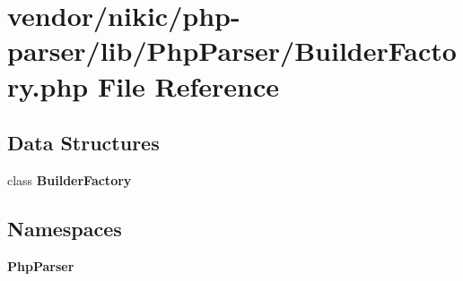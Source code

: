 \section{vendor/nikic/php-\/parser/lib/\+Php\+Parser/\+Builder\+Factory.php File Reference}
\label{_builder_factory_8php}
\subsection*{Data Structures}
\begin{DoxyCompactItemize}
\item 
class {\bf Builder\+Factory}
\end{DoxyCompactItemize}
\subsection*{Namespaces}
\begin{DoxyCompactItemize}
\item 
 {\bf Php\+Parser}
\end{DoxyCompactItemize}
